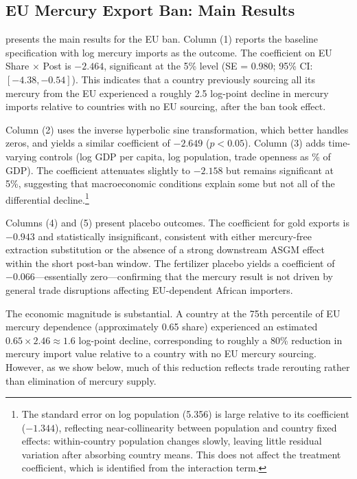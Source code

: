 \documentclass[12pt]{article}
\begin{document}
\subsection{EU Mercury Export Ban: Main Results}

 presents the main results for the EU ban. Column (1) reports the baseline specification with log mercury imports as the outcome. The coefficient on EU Share $\times$ Post is $-2.464$, significant at the 5\% level (SE = 0.980; 95\% CI: $[-4.38, -0.54]$). This indicates that a country previously sourcing all its mercury from the EU experienced a roughly 2.5 log-point decline in mercury imports relative to countries with no EU sourcing, after the ban took effect.


\label{tab:eu_ban}

Column (2) uses the inverse hyperbolic sine transformation, which better handles zeros, and yields a similar coefficient of $-2.649$ ($p < 0.05$). Column (3) adds time-varying controls (log GDP per capita, log population, trade openness as \% of GDP). The coefficient attenuates slightly to $-2.158$ but remains significant at 5\%, suggesting that macroeconomic conditions explain some but not all of the differential decline.\footnote{The standard error on log population (5.356) is large relative to its coefficient ($-1.344$), reflecting near-collinearity between population and country fixed effects: within-country population changes slowly, leaving little residual variation after absorbing country means. This does not affect the treatment coefficient, which is identified from the interaction term.}

Columns (4) and (5) present placebo outcomes. The coefficient for gold exports is $-0.943$ and statistically insignificant, consistent with either mercury-free extraction substitution or the absence of a strong downstream ASGM effect within the short post-ban window. The fertilizer placebo yields a coefficient of $-0.066$---essentially zero---confirming that the mercury result is not driven by general trade disruptions affecting EU-dependent African importers.

The economic magnitude is substantial. A country at the 75th percentile of EU mercury dependence (approximately 0.65 share) experienced an estimated $0.65 \times 2.46 \approx 1.6$ log-point decline, corresponding to roughly a 80\% reduction in mercury import value relative to a country with no EU mercury sourcing. However, as we show below, much of this reduction reflects trade rerouting rather than elimination of mercury supply.
\end{document}

